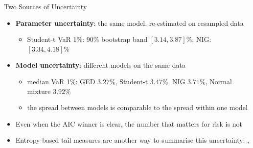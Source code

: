 \begin{frame}{Two Sources of Uncertainty}
\itemsize{\small}
\begin{itemize}
    \item \textbf{Parameter uncertainty}: the same model, re-estimated on resampled data
    \begin{itemize}
        \item Student-t VaR 1\%: 90\% bootstrap band $[3.14, 3.87]\%$; NIG: $[3.34, 4.18]\%$
    \end{itemize}
    \item \textbf{Model uncertainty}: different models on the same data
    \begin{itemize}
        \item median VaR 1\%: GED $3.27\%$, Student-t $3.47\%$, NIG $3.71\%$, Normal mixture $3.92\%$
        \item the spread between models is comparable to the spread within one model
    \end{itemize}
    \item Even when the AIC winner is clear, the number that matters for risk is not
    \item Entropy-based tail measures are another way to summarise this uncertainty: , 
\end{itemize}
\end{frame}

